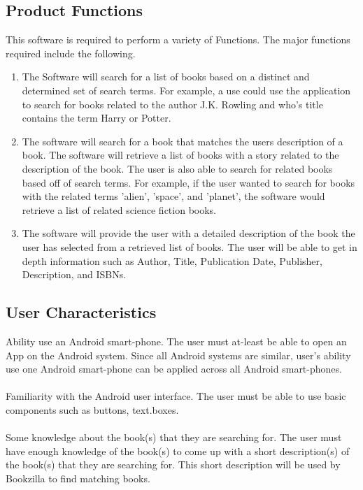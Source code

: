 \documentclass[12pt, titlepage, a4paper]{article}
\begin{document}
\subsection{Product Functions}
\label{sub:product_functions}
This software is required to perform a variety of Functions. The major functions required include the following.
\begin{enumerate}[1.]
	\item The Software will search for a list of books based on a distinct and determined set of search terms. For example, a use could use the application to search for books related to the author J.K. Rowling and who's title contains the term Harry or Potter. 
	
	\item The software will search for a book that matches the users description of a book. The software will retrieve a list of books with a story related to the description of the book. The user is also able to search for related books based off of search terms. For example, if the user wanted to search for books with the related terms 'alien', 'space', and 'planet', the software would retrieve a list of related science fiction books.
	
	\item The software will provide the user with a detailed description of the book the user has selected from a retrieved list of books. The user will be able to get in depth information such as Author, Title, Publication Date, Publisher, Description, and ISBNs. 
	
\end{enumerate}

\subsection{User Characteristics}
\label{sub:user_characteristics}
Ability use an Android smart-phone. The user must at-least be able to open an App on the Android system. Since all Android systems are similar, user's ability use one Android smart-phone can be applied across all Android smart-phones.\\\\
\noindent Familiarity with the Android user interface. The user must be able to use basic components such as buttons, text.boxes.\\\\
\noindent Some knowledge about the book(s) that they are searching for. The user must have enough knowledge of the book(s) to come up with a short description(s) of the book(s) that they are searching for. This short description will be used by Bookzilla to find matching books.
\end{document}
